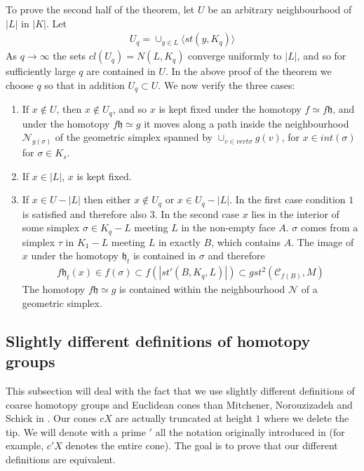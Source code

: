 \documentclass[a4paper,11pt]{article}
\theoremstyle{definition}
\theoremstyle{plain}
\theoremstyle{remark}
\begin{document}
{To prove the second half of the theorem, let $U$ be an arbitrary neighbourhood of $|L|$ in $|K|$. Let 
\begin{align*}
U_q = \cup_{y\in L} \langle st(y,K_q)\rangle 
\end{align*}
As $q\rightarrow \infty$ the sets $cl(U_q) = N(L,K_{q})$ converge uniformly to $|L|$, and so for sufficiently large $q$ are contained in $U$. In the above proof of the theorem we choose $q$ so that in addition $U_q\subset U$. We now verify the three cases:
\begin{enumerate}
\item If $x\notin U$, then $x\notin U_q$, and so $x$ is kept fixed under the homotopy $f\simeq f\mathfrak{h}$, and under the homotopy $f\mathfrak{h} \simeq g$ it moves along a path inside the neighbourhood $\mathcal{N}_{g(\sigma)}$ of the geometric simplex spanned by $\cup_{v \in vert \sigma} g(v)$, for $x \in int (\sigma)$ for $\sigma \in K_{s}$. 
\item If $x\in |L|$, $x$ is kept fixed.
\item If $x\in U - |L|$ then either $x\notin U_q$ or $x\in U_q - |L|$. In the first case condition $1$ is satisfied and therefore also $3$. In the second case $x$ lies in the interior of some simplex $\sigma \in K_q - L$ meeting $L$ in the non-empty face $A$. $\sigma$ comes from a simplex $\tau$ in $K_{1}-L$ meeting $L$ in exactly $B$, which contains $A$. The image of $x$ under the homotopy $\mathfrak{h}_t$ is contained in $\sigma$ and therefore
\begin{align*}
f\mathfrak{h}_t (x)\in f(\sigma) \subset f(|st'(B,K_{q},L)|) \subset gst^2(\mathscr{C}_{f(B)},M)
\end{align*}
The homotopy $f\mathfrak{h}\simeq g$ is contained within the neighbourhood $ \mathcal{N}$ of a geometric simplex.
\end{enumerate}

\subsection{Slightly different definitions of homotopy groups}\label{diffdef}

This subsection will deal with the fact that we use slightly different definitions of coarse homotopy groups and Euclidean cones than Mitchener, Norouzizadeh and Schick in \cite{mitchener2020coarse}. Our cones $cX$ are actually truncated at height $1$ where we delete the tip. We will denote with a prime $'$ all the notation originally introduced in \cite{mitchener2020coarse} (for example, $c'X$ denotes the entire cone). The goal is to prove that our different definitions are equivalent.


}
\end{document}
